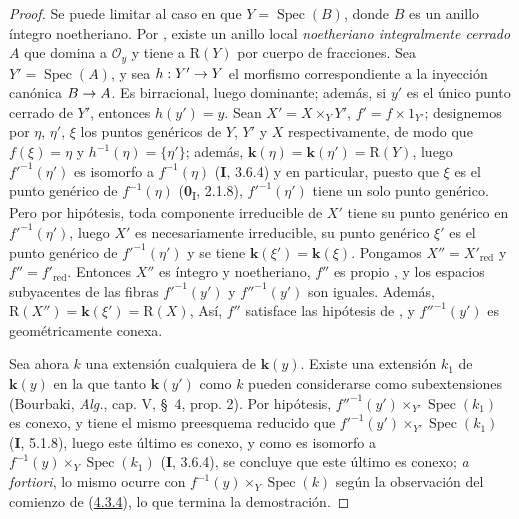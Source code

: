 \documentclass[10pt,oneside,openany]{book}
\theoremstyle{egaenv}\newtheorem*{env}{---}
\theoremstyle{egastatement}
\theoremstyle{egadescription}
\newcommand{\oldpage}[2][]{\marginnote{\normalfont\scriptsize\textbf{#1}\,|\,#2}\ignorespaces}
\renewcommand{\to}{\mathchoice{\longrightarrow}{\rightarrow}{\rightarrow}{\rightarrow}}
\begin{document}
\begin{proof}
Se puede limitar al caso en que $Y=\operatorname{Spec}(B)$, donde $B$ es un anillo
íntegro noetheriano. Por , existe un anillo local
\emph{noetheriano integralmente cerrado} $A$ que domina a $\mathcal O_y$ y tiene a
$\mathrm R(Y)$ por cuerpo de fracciones. Sea $Y'=\operatorname{Spec}(A)$, y
sea $h:Y'\to Y$ el morfismo correspondiente a la inyección canónica
$B\to A$. Es birracional, luego dominante; además, si $y'$ es el
único punto cerrado de $Y'$, entonces $h(y')=y$. Sean
\oldpage[III]{134}
$X'=X\times_YY'$, $f'=f\times1_{Y'}$; designemos por $\eta$, $\eta'$,
$\xi$ los puntos genéricos de $Y$, $Y'$ y $X$ respectivamente, de modo
que $f(\xi)=\eta$ y $h^{-1}(\eta)=\{\eta'\}$; además,
$\boldsymbol{k}(\eta)=\boldsymbol{k}(\eta')=\mathrm R(Y)$, luego $f'^{-1}(\eta')$ es isomorfo a
$f^{-1}(\eta)$ (\textbf{I}, 3.6.4) y en particular, puesto que $\xi$ es el punto
genérico de $f^{-1}(\eta)$ (\textbf{0}\textsubscript{I}, 2.1.8),
$f'^{-1}(\eta')$ tiene un solo punto genérico. Pero por hipótesis, toda
componente irreducible de $X'$ tiene su punto genérico en
$f'^{-1}(\eta')$, luego $X'$ es necesariamente irreducible, su punto
genérico $\xi'$ es el punto genérico de $f'^{-1}(\eta')$ y se tiene
$\boldsymbol{k}(\xi')=\boldsymbol{k}(\xi)$.
Pongamos $X''=X'_{\mathrm{red}}$ y $f''=f'_{\mathrm{red}}$. Entonces
$X''$ es íntegro y noetheriano, $f''$ es propio
, y los espacios subyacentes de las fibras
$f'^{-1}(y')$ y $f''^{-1}(y')$ son iguales. Además,
$\mathrm R(X'')=\boldsymbol{k}(\xi')=\mathrm R(X)$,
Así, $f''$ satisface las hipótesis de , y
$f''^{-1}(y')$ es geométricamente conexa.

Sea ahora $k$ una extensión cualquiera de $\boldsymbol{k}(y)$. Existe una
extensión $k_1$ de $\boldsymbol{k}(y)$ en la que tanto $\boldsymbol{k}(y')$ como $k$ pueden considerarse como subextensiones (Bourbaki, \emph{Alg.}, cap. V, \S~4, prop. 2). Por hipótesis, $f''^{-1}(y')\times_{Y'}\operatorname{Spec}(k_1)$ es conexo, y tiene el mismo preesquema reducido que $f'^{-1}(y')\times_{Y'}\operatorname{Spec}(k_1)$ (\textbf{I}, 5.1.8), luego este último es conexo, y como es isomorfo a $f^{-1}(y)\times_Y\operatorname{Spec}(k_1)$ (\textbf{I}, 3.6.4), se concluye que este último es conexo; \emph{a fortiori}, lo mismo ocurre con $f^{-1}(y)\times_Y\operatorname{Spec}(k)$ según la observación del comienzo de (\hyperref[III.4.3.4-fr]{4.3.4}), lo que termina la demostración.
\end{proof}
\end{document}
